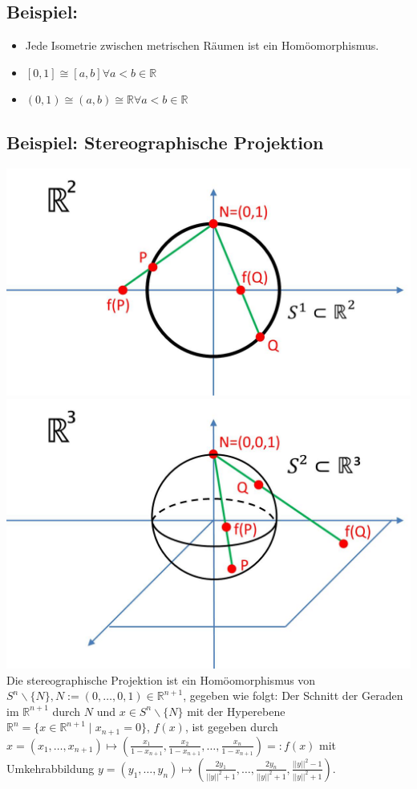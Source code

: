 \documentclass[a4paper,11pt,notitlepage]{report}
\theoremstyle{definition}
\newcommand{\R}{{\ensuremath{\mathbb{R}}}}
\newenvironment{bsp}[1]
{
\setlength{\fboxsep}{10pt}
\subsection*{Beispiel: #1}
\begin{upshape}
}
{
\end{upshape}
}
\begin{document}
\begin{bsp}{}
	\begin{itemize}
		\item Jede Isometrie zwischen metrischen Räumen ist ein Homöomorphismus.
		\item $[0,1] \cong [a,b] \forall a < b \in \R$
		\item $(0,1) \cong (a,b) \cong \R \forall a < b \in \R$
	\end{itemize}
\end{bsp}

\begin{bsp}{Stereographische Projektion}
	\includegraphics[scale=0.35]{images/Stereographie_S1_R1.jpg}
	\includegraphics[scale=0.35]{images/Stereographie_S2_R2.jpg}
	\newline
	Die stereographische Projektion ist ein Homöomorphismus von $S^n \backslash \{N\}, N := (0, \ldots, 0, 1) \in \R^{n+1}$, gegeben wie folgt:
	\newline
	Der Schnitt der Geraden im $\R^{n+1}$ durch $N$ und $x \in S^n \backslash \{N\}$ mit der Hyperebene $\R^n=\{x \in \R^{n+1} \mid x_{n+1} = 0 \}$, $f(x)$, ist gegeben durch $x = (x_1, \ldots, x_{n+1}) \mapsto (\frac{x_1}{1-x_{n+1}}, \frac{x_2}{1-x_{n+1}}, \ldots, \frac{x_n}{1-x_{n+1}}) =: f(x)$ mit Umkehrabbildung $y = (y_1, \ldots, y_n) \mapsto (\frac{2 y_1}{||y||^2+1}, \ldots, \frac{2 y_n}{||y||^2+1},\frac{||y||^2-1}{||y||^2+1})$.
\end{bsp}
\end{document}
